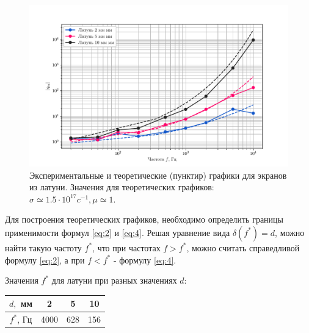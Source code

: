 \begin{figure}[H]
	\centering
	\includegraphics[width=0.95\linewidth]{fig/lat}
	\caption{Экспериментальные и теоретические (пунктир) графики для экранов из латуни. Значения для теоретических
	графиков: $\sigma \simeq 1.5 \cdot 10^{17}c^{-1}, \mu \simeq 1$.}
	\label{fig:figure3}
\end{figure}

Для построения теоретических графиков, необходимо определить границы применимости формул \eqref{eq:2} и \eqref{eq:4}.
Решая уравнение вида $\delta(f^*) = d$, можно найти такую частоту $f^*$, что при частотах $f>f^*$, можно считать справедливой формулу
\eqref{eq:2}, а при $f<f^*$ - формулу \eqref{eq:4}.

Значения $f^*$ для латуни при разных значениях $d$:
\begin{table}[H]
	\centering
	\begin{tabular}{|c|c|c|c|}
	\hline
	$d,$ мм & 2 & 5 & 10 \\ \hline
	$f^*$, Гц  & 4000  & 628  & 156 \\ \hline
	\end{tabular}
\end{table}







